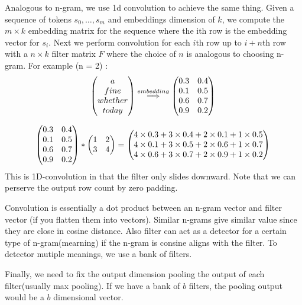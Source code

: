 \documentclass[twocolumn, 10pt]{article}
\begin{document}
Analogous to n-gram, we use 1d convolution to achieve the same thing. Given a sequence of tokens $s_0, \ldots, s_m$ and embeddings dimension of $k$, we compute the $m \times k$ embedding matrix for the sequence where the ith row is the embedding vector for $s_i$.  Next we perform convolution for each $i$th row up to $i+n$th row with a $n \times k$ filter matrix $F$ where the choice of $n$ is analogous to choosing n-gram. For example (n = 2) :
$$
\begin{pmatrix}
	a \\
	fine \\
	whether \\
	today
\end{pmatrix} 
\overset{embedding}{\Longrightarrow}
\begin{pmatrix}
  0.3  & 0.4 \\
  0.1  & 0.5 \\
  0.6 &  0.7 \\
  0.9 & 0. 2
\end{pmatrix} \\
$$

$$
\begin{pmatrix}
0.3  & 0.4 \\
0.1  & 0.5 \\
0.6 &  0.7 \\
0.9 & 0. 2
\end{pmatrix} 
\ast \begin{pmatrix}
1 & 2 \\
3 & 4
\end{pmatrix}
=
\begin{pmatrix}
4 \times 0.3 + 3 \times 0.4 + 2 \times 0.1 + 1 \times 0.5 \\
4 \times 0.1 + 3 \times 0.5 + 2 \times 0.6 + 1 \times 0.7 \\
4 \times 0.6 + 3 \times 0.7 + 2 \times 0.9 + 1 \times 0.2
\end{pmatrix} \\
$$
This is 1D-convolution in that the filter only slides downward. Note that we can perserve the output row count by zero padding.


Convolution is essentially a dot product between an n-gram vector and filter vector (if you flatten them into vectors). Similar n-grams give similar value since they are close in cosine distance. Also filter can act as a detector for a certain type of n-gram(mearning) if the n-gram is consine aligns with the filter.  To detector mutiple meanings, we use a bank of filters.

Finally, we need to fix the output dimension pooling the output of each filter(usually max pooling). If we have a bank of $b$ filters, the pooling output would be a $b$ dimensional vector.
\end{document}
